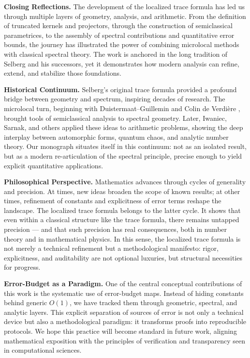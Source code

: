 \bigskip
\noindent\textbf{Closing Reflections.}
The development of the localized trace formula has led us through multiple layers of geometry, analysis, and arithmetic. From the definition of truncated kernels and projectors, through the construction of semiclassical parametrices, to the assembly of spectral contributions and quantitative error bounds, the journey has illustrated the power of combining microlocal methods with classical spectral theory. The work is anchored in the long tradition of Selberg and his successors, yet it demonstrates how modern analysis can refine, extend, and stabilize those foundations.

\medskip
\noindent\textbf{Historical Continuum.}
Selberg’s original trace formula \cite{Selberg1956} provided a profound bridge between geometry and spectrum, inspiring decades of research. The microlocal turn, beginning with Duistermaat–Guillemin \cite{DG1975} and Colin de Verdière \cite{CdV1980}, brought tools of semiclassical analysis to spectral geometry. Later, Iwaniec, Sarnak, and others applied these ideas to arithmetic problems, showing the deep interplay between automorphic forms, quantum chaos, and analytic number theory. Our monograph situates itself in this continuum: not as an isolated result, but as a modern re-articulation of the spectral principle, precise enough to yield explicit quantitative applications.

\medskip
\noindent\textbf{Philosophical Perspective.}
Mathematics advances through cycles of generality and precision. At times, new ideas broaden the scope of known results; at other times, refinement of constants and explicitness of error terms reshape the landscape. The localized trace formula belongs to the latter cycle. It shows that even within a classical structure like the trace formula, there remains untapped precision --- and that such precision has real consequences, both in number theory and in mathematical physics. In this sense, the localized trace formula is not merely a technical refinement but a methodological manifesto: rigor, explicitness, and auditability are not optional luxuries, but structural necessities for progress.

\medskip
\noindent\textbf{Error-Budget as a Paradigm.}
One of the central conceptual contributions of this work is the systematic use of error-budget maps. Instead of hiding constants behind generic $O(1)$, we have tracked them through geometric, spectral, and analytic layers. This explicit separation of sources of error is not only a technical device but also a methodological paradigm: it transforms proofs into reproducible protocols. We hope this practice will become standard in future work, aligning mathematical exposition with the principles of verification and transparency seen in computational sciences.

